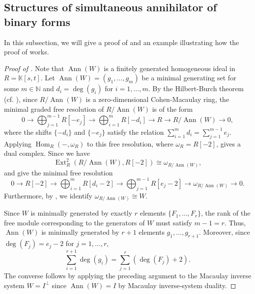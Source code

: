 \documentclass[a4paper, 11pt]{amsart}
\numberwithin{theorem}{section}
\theoremstyle{definition}
\numberwithin{equation}{section}
\DeclareMathOperator{\Ann}{\operatorname{Ann}}
\begin{document}
\subsection{Structures of simultaneous annihilator of binary forms}\label{sec:proofofMainThm}
In this subsection, we will give a proof of  and an example illustrating how the proof of  works.

\begin{proof}[Proof of ]
Note that $\Ann(W)$ is a finitely generated homogeneous ideal in $R = \mathbb{K}[s,t]$. 
Let $\Ann(W) = (g_1, \dots, g_m)$ be a minimal generating set for some $m \in \mathbb{N}$ and $d_i = \deg(g_i)$ for $i = 1, \dots, m$. 
By the Hilbert-Burch theorem (cf. \cite[Proposition 3.8]{MR2103875}), since $R/\Ann(W)$ is a zero-dimensional Cohen-Macaulay ring, the minimal graded free resolution of $R/\Ann(W)$ is of the form
\[
0 \longrightarrow \bigoplus_{j = 1}^{m-1} R[-e_j] \longrightarrow \bigoplus_{i = 1}^{m} R[-d_i] \longrightarrow R \longrightarrow R/\Ann(W) \longrightarrow 0,
\]
where the shifts $\{-d_i\}$ and $\{-e_j\}$ satisfy the relation $\sum_{i = 1}^{m} d_i = \sum_{j = 1}^{m-1} e_j$.
Applying $\operatorname{Hom}_R(-,\omega_R)$ to this free resolution, where $\omega_R = R[-2]$, gives a dual complex. 
Since we have 
\[
\operatorname{Ext}_R^2(R/\Ann(W),R[-2]) \cong \omega_{R/\Ann(W)},
\]
 and  give the minimal free resolution
\[
0 \longrightarrow R[-2] \longrightarrow \bigoplus_{i = 1}^{m} R[d_i-2] \longrightarrow \bigoplus_{j = 1}^{m-1} R[e_j-2] \longrightarrow \omega_{R/\Ann(W)} \longrightarrow 0.
\] 
Furthermore, by , we identify $\omega_{R/\Ann(W)} \cong W$.

Since $W$ is minimally generated by exactly $r$ elements $\{F_1, \dots, F_r\}$, the rank of the free module corresponding to the generators of $W$ must satisfy $m - 1 = r$. 
Thus, $\Ann(W)$ is minimally generated by $r+1$ elements $g_1, \dots, g_{r+1}$. 
Moreover, since $\deg(F_j) = e_j - 2$ for $j = 1, \dots, r$,
\[
\sum_{i = 1}^{r+1} \deg(g_i) = \sum_{j = 1}^{r} (\deg(F_j) + 2).
\]
The converse follows by applying the preceding argument to the Macaulay inverse system $W=I^\perp$ since $\Ann(W)=I$ by Macaulay inverse-system duality.
\end{proof}
\end{document}
